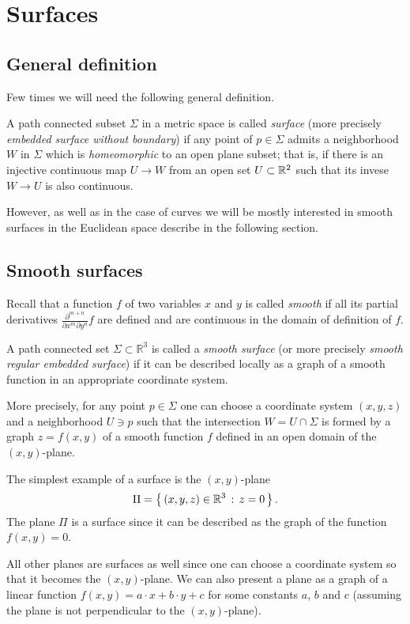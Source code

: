 \chapter{Surfaces}

\section*{General definition}

Few times we will need the following general definition.

A path connected subset $\Sigma$ in a metric space is called \emph{surface} (more precisely \emph{embedded surface without boundary}) 
if any point of $p\in \Sigma$ admits a neighborhood $W$ in $\Sigma$ which is \emph{homeomorphic} to an open plane subset;
that is, if there is an injective continuous map $U\to W$ from an open set $U\subset \mathbb{R}^2$ such that its invese $W\to U$ is also continuous.

However, as well as in the case of curves we will be mostly interested in smooth surfaces in the Euclidean space describe in the following section.

\section*{Smooth surfaces}

Recall that a function $f$ of two variables $x$ and $y$ is called \emph{smooth} if all its partial derivatives $\frac{\partial^{m+n}}{\partial x^m\partial y^n}f$ are defined and are continuous in the domain of definition of $f$. 

A path connected set $\Sigma \subset \mathbb{R}^3$ is called a \emph{smooth surface} (or more precisely \emph{smooth regular embedded surface}) if it can be described locally as a graph of a smooth function in an appropriate coordinate system.\label{page:def-smooth-surface}

More precisely, for any point $p\in \Sigma$ one can choose a coordinate system $(x,y,z)$ and a neighborhood $U\ni p$ such that
the intersection $W=U\cap \Sigma$ is formed by a graph $z=f(x,y)$ of a smooth function $f$ defined in an open domain of the $(x,y)$-plane.

The simplest example of a surface is the $(x,y)$-plane 
\[\Pi=\left\{\,{(x,y,z)\in\mathbb{R}^3}\,:\,{z=0}\,\right\}.\]
The plane $\Pi$ is a surface since
it can be described as the graph of the function $f(x,y)=0$.

All other planes are surfaces as well since one can choose a coordinate system so that it becomes the $(x,y)$-plane.
We can also present a plane as a graph of a linear function 
$f(x,y)=a\cdot x+b\cdot y+c$ for some constants $a$, $b$ and $c$
(assuming the plane is not perpendicular to the $(x,y)$-plane).

